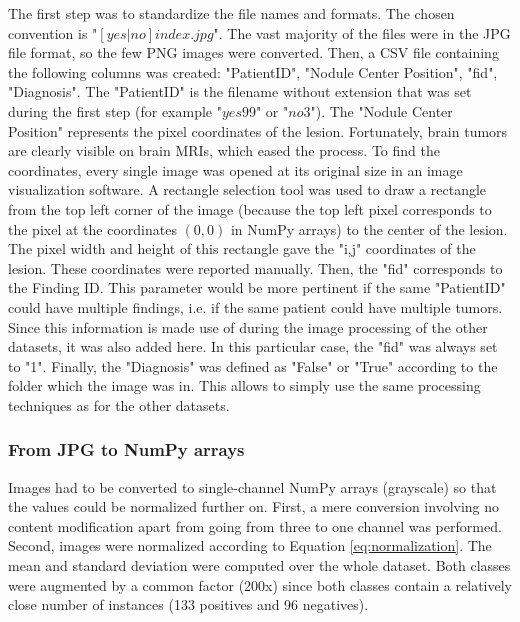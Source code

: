 The first step was to standardize the file names and formats. The chosen convention is "$[yes|no]{index}.jpg$". The vast majority of the files were in the JPG file format, so the few PNG images were converted. Then, a CSV file containing the following columns was created: "PatientID", "Nodule Center Position", "fid", "Diagnosis". The "PatientID" is the filename without extension that was set during the first step (for example "$yes99$" or "$no3$"). The "Nodule Center Position" represents the pixel coordinates of the lesion. Fortunately, brain tumors are clearly visible on brain MRIs, which eased the process. To find the coordinates, every single image was opened at its original size in an image visualization software. A rectangle selection tool was used to draw a rectangle from the top left corner of the image (because the top left pixel corresponds to the pixel at the coordinates $(0,0)$ in NumPy arrays) to the center of the lesion. The pixel width and height of this rectangle gave the "i,j" coordinates of the lesion. These coordinates were reported manually. Then, the "fid" corresponds to the Finding ID. This parameter would be more pertinent if the same "PatientID" could have multiple findings, i.e. if the same patient could have multiple tumors. Since this information is made use of during the image processing of the other datasets, it was also added here. In this particular case, the "fid" was always set to "1". Finally, the "Diagnosis" was defined as "False" or "True" according to the folder which the image was in. This allows to simply use the same processing techniques as for the other datasets.


\subsubsection{From JPG to NumPy arrays}
\setlength{\marginparwidth}{3cm}\leavevmode {}Images had to be converted to single-channel NumPy arrays (grayscale) so that the values could be normalized further on. First, a mere conversion involving no content modification apart from going from three to one channel was performed. Second, images were normalized according to Equation \ref{eq:normalization}. The mean and standard deviation were computed over the whole dataset. Both classes were augmented by a common factor (200x) since both classes contain a relatively close number of instances (133 positives and 96 negatives).

